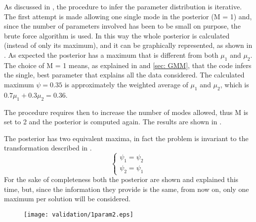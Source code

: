 		As discussed in , the procedure to infer the parameter distribution is iterative. The first attempt is made allowing one single mode in the posterior (M = 1) and, since the number of parameters involved has been  to be small on purpose, the brute force algorithm is used. In this way the whole posterior is calculated (instead of only its maximum), and it can be graphically represented, as shown in . As expected the posterior has a maximum that is different from both $ \mu_1 $ and $ \mu_2 $. The choice of M = 1 means, as explained in  and \ref{sec: GMM}, that the code infers the single, best parameter that explains all the data considered. The calculated maximum $ \psi = 0.35 $ is approximately the weighted average of $ \mu_1 $ and $ \mu_2 $, which is $ 0.7 \mu_1 + 0.3 \mu_2 = 0.36 $.
		
		The procedure requires then to increase the number of modes allowed, thus M is set to 2 and the posterior is computed again. The results are shown in . 
		
		The posterior has two equivalent maxima, in fact the problem is invariant to the transformation described in .
		\begin{equation}
			\begin{cases}
				\psi_1 = \psi_2\\
				\psi_2 = \psi_1
			\end{cases}
			\label{eq: transformation}
		\end{equation}
		For the sake of completeness both the posterior are shown and explained this time, but, since the information they provide is the same, from now on, only one maximum per solution will be considered.
		\begin{figure}
			\centering
			\texttt{[image: validation/1param2.eps]}
			\caption{}
			\label{val: 1param2}
		\end{figure}
	
